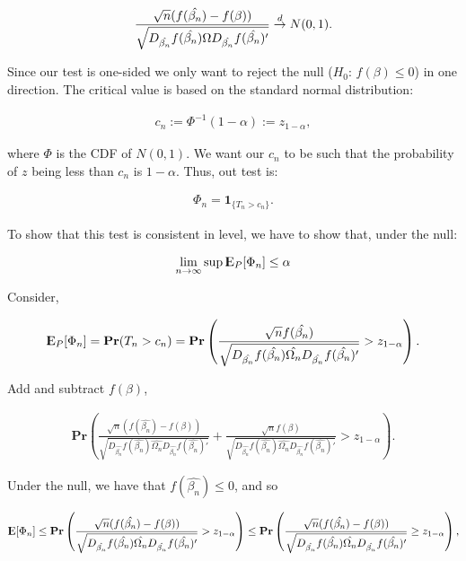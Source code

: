 \documentclass[12pt]{paper}
\newcommand{\E}{{\rm I\kern-.3em E}}
\begin{document}
\begin{align*}
\frac{\sqrt{n}(f(\hat{\beta_n})-f(\beta))}{\sqrt{D_{\hat{\beta_n}}f(\hat{\beta_n})\Omega D_{\hat{\beta_n}}f(\hat{\beta_n})'}} \overset{d}{\to} N(0,1).
\end{align*}

Since our test is one-sided we only want to reject the null ($H_0$: $f(\beta) \leq 0$) in one direction. The critical value is based on the standard normal distribution:

\begin{align*}
c_n:=\Phi^{-1}(1-\alpha):=z_{1-\alpha},
\end{align*}

where $\Phi$ is the CDF of $N(0,1)$. We want our $c_n$ to be such that the probability of $z$ being less than $c_n$ is $1-\alpha$. Thus, out test is:

\begin{align*}
\Phi_n=\textbf{1}_{\{T_n>c_n\}}.
\end{align*}

To show that this test is consistent in level, we have to show that, under the null:

\begin{align*}
\lim_{n \to \infty} \sup \E_P[\Phi_n] \leq \alpha
\end{align*}

Consider,

\begin{align*}
\E_P[\Phi_n]=\textbf{Pr}(T_n>c_n)=\textbf{Pr}\left(\frac{\sqrt{n}f(\hat{\beta_n})}{\sqrt{D_{\hat{\beta_n}}f(\hat{\beta_n}) \hat{\Omega_n} D_{\hat{\beta_n}}f(\hat{\beta_n})'}}>z_{1-\alpha} \right).
\end{align*}

Add and subtract $f(\beta)$,

\begin{align*}
\textbf{Pr}\left(
\frac{\sqrt{n}(f(\hat{\beta_n})-f(\beta))}{\sqrt{D_{\hat{\beta_n}}f(\hat{\beta_n}) \hat{\Omega_n} D_{\hat{\beta_n}}f(\hat{\beta_n})'}}
+
\frac{\sqrt{n}f(\beta)}{\sqrt{D_{\hat{\beta_n}}f(\hat{\beta_n}) \hat{\Omega_n} D_{\hat{\beta_n}}f(\hat{\beta_n})'}}
>
z_{1-\alpha}
\right).
\end{align*}

Under the null, we have that $f(\hat{\beta_n})\leq0$, and so

\begin{align*}
\E[\Phi_n]
\leq
\textbf{Pr}\left(
\frac{\sqrt{n}(f(\hat{\beta_n})-f(\beta))}{\sqrt{D_{\hat{\beta_n}}f(\hat{\beta_n}) \hat{\Omega_n} D_{\hat{\beta_n}}f(\hat{\beta_n})'}}
>
z_{1-\alpha}
\right)
\leq
\textbf{Pr}\left(
\frac{\sqrt{n}(f(\hat{\beta_n})-f(\beta))}{\sqrt{D_{\hat{\beta_n}}f(\hat{\beta_n}) \hat{\Omega_n} D_{\hat{\beta_n}}f(\hat{\beta_n})'}}
\geq
z_{1-\alpha}
\right),
\end{align*}
\end{document}
